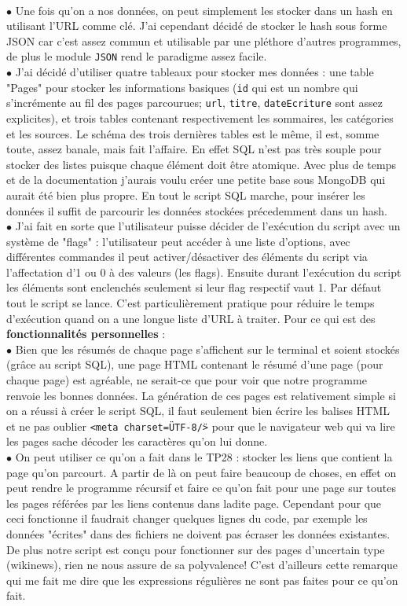 \documentclass[11pt]{article}
\begin{document}
\\ $\bullet$ Une fois qu'on a nos données, on peut simplement les stocker dans un hash en utilisant l'URL comme clé. J'ai cependant décidé de stocker le hash sous forme JSON car c'est assez commun et utilisable par une pléthore d'autres programmes, de plus le module \texttt{JSON} rend le paradigme assez facile.
\\ $\bullet$ J'ai décidé d'utiliser quatre tableaux pour stocker mes données : une table "Pages" pour stocker les informations basiques (\texttt{id} qui est un nombre qui s'incrémente au fil des pages parcourues; \texttt{url}, \texttt{titre}, \texttt{dateEcriture} sont assez explicites), et trois tables contenant respectivement les sommaires, les catégories et les sources. Le schéma des trois dernières tables est le même, il est, somme toute, assez banale, mais fait l'affaire. En effet SQL n'est pas très souple pour stocker des listes puisque chaque élément doit être atomique. Avec plus de temps et de la documentation j'aurais voulu créer une petite base sous MongoDB qui aurait été bien plus propre. En tout le script SQL marche, pour insérer les données il suffit de parcourir les données stockées précedemment dans un hash.
\\ $\bullet$ J'ai fait en sorte que l'utilisateur puisse décider de l'exécution du script avec un système de "flags" : l'utilisateur peut accéder à une liste d'options, avec différentes commandes il peut activer/désactiver des éléments du script via l'affectation d'1 ou 0 à des valeurs (les flags). Ensuite durant l'exécution du script les éléments sont enclenchés seulement si leur flag respectif vaut 1. Par défaut tout le script se lance. C'est particulièrement pratique pour réduire le temps d'exécution quand on a une longue liste d'URL à traiter.
\bigskip
\newline
\bigskip
Pour ce qui est des \textbf{fonctionnalités personnelles} :
\\ $\bullet$ Bien que les résumés de chaque page s'affichent sur le terminal et soient stockés (grâce au script SQL), une page HTML contenant le résumé d'une page (pour chaque page) est agréable, ne serait-ce que pour voir que notre programme renvoie les bonnes données. La génération de ces pages est relativement simple si on a réussi à créer le script SQL, il faut seulement bien écrire les balises HTML et ne pas oublier \texttt{<meta charset=\"UTF-8\" />} pour que le navigateur web qui va lire les pages sache décoder les caractères qu'on lui donne.
\\ $\bullet$ On peut utiliser ce qu'on a fait dans le TP28 : stocker les liens que contient la page qu'on parcourt. A partir de là on peut faire beaucoup de choses, en effet on peut rendre le programme récursif et faire ce qu'on fait pour une page sur toutes les pages référées par les liens contenus dans ladite page. Cependant pour que ceci fonctionne il faudrait changer quelques lignes du code, par exemple les données "écrites" dans des fichiers ne doivent pas écraser les données existantes. De plus notre script est conçu pour fonctionner sur des pages d'uncertain type (wikinews), rien ne nous assure de sa polyvalence! C'est d'ailleurs cette remarque qui me fait me dire que les expressions régulières ne sont pas faites pour ce qu'on fait.
\end{document}
